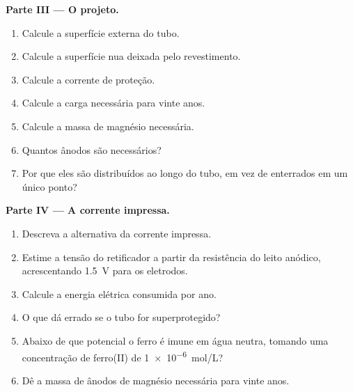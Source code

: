 \begin{problem}
\medskip
\noindent\textbf{Parte III --- O projeto.}
\begin{enumerate}[resume]
  \item Calcule a superfície externa do tubo.
  \item Calcule a superfície nua deixada pelo revestimento.
  \item Calcule a corrente de proteção.
  \item Calcule a carga necessária para vinte anos.
  \item Calcule a massa de magnésio necessária.
  \item Quantos ânodos são necessários?
  \item Por que eles são distribuídos ao longo do tubo, em vez de enterrados
        em um único ponto?
\end{enumerate}

\medskip
\noindent\textbf{Parte IV --- A corrente impressa.}
\begin{enumerate}[resume]
  \item Descreva a alternativa da corrente impressa.
  \item Estime a tensão do retificador a partir da resistência do leito
        anódico, acrescentando \qty{1.5}{V} para os eletrodos.
  \item Calcule a energia elétrica consumida por ano.
  \item O que dá errado se o tubo for superprotegido?
  \item Abaixo de que potencial o ferro é imune em água neutra, tomando uma
        concentração de ferro(II) de \qty{1e-6}{mol/L}?
  \item Dê a massa de ânodos de magnésio necessária para vinte anos.
\end{enumerate}
\end{problem}
